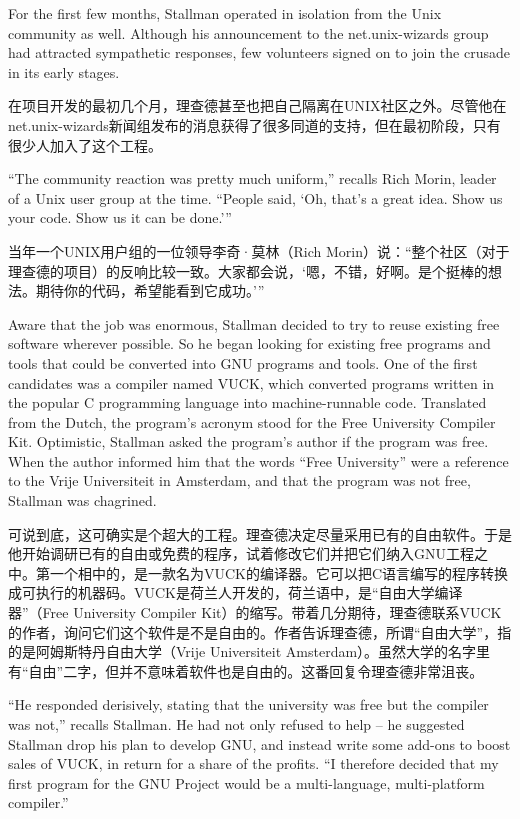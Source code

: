 \ifdefined\eng
For the first few months, Stallman operated in isolation from the Unix community as well. Although his announcement to the net.unix-wizards group had attracted sympathetic responses, few volunteers signed on to join the crusade in its early stages.
\fi

\ifdefined\chs
在项目开发的最初几个月，理查德甚至也把自己隔离在UNIX社区之外。尽管他在net.unix-wizards新闻组发布的消息获得了很多同道的支持，但在最初阶段，只有很少人加入了这个工程。
\fi

\ifdefined\eng
``The community reaction was pretty much uniform,'' recalls Rich Morin, leader of a Unix user group at the time. ``People said, `Oh, that's a great idea. Show us your code. Show us it can be done.'\hspace{0.01in}''
\fi

\ifdefined\chs
当年一个UNIX用户组的一位领导李奇·莫林（Rich Morin）说：“整个社区（对于理查德的项目）的反响比较一致。大家都会说，‘嗯，不错，好啊。是个挺棒的想法。期待你的代码，希望能看到它成功。’”
\fi

\ifdefined\eng
Aware that the job was enormous, Stallman decided to try to reuse existing free software wherever possible.  So he began looking for existing free programs and tools that could be converted into GNU programs and tools. One of the first candidates was a compiler named VUCK, which converted programs written in the popular C programming language into machine-runnable code. Translated from the Dutch, the program's acronym stood for the Free University Compiler Kit. Optimistic, Stallman asked the program's author if the program was free. When the author informed him that the words ``Free University'' were a reference to the Vrije Universiteit in Amsterdam, and that the program was not free, Stallman was chagrined.
\fi

\ifdefined\chs
可说到底，这可确实是个超大的工程。理查德决定尽量采用已有的自由软件。于是他开始调研已有的自由或免费的程序，试着修改它们并把它们纳入GNU工程之中。第一个相中的，是一款名为VUCK的编译器。它可以把C语言编写的程序转换成可执行的机器码。VUCK是荷兰人开发的，荷兰语中，是“自由大学编译器”（Free University Compiler Kit）的缩写。带着几分期待，理查德联系VUCK的作者，询问它们这个软件是不是自由的。作者告诉理查德，所谓“自由大学”，指的是阿姆斯特丹自由大学（Vrije Universiteit Amsterdam）。虽然大学的名字里有“自由”二字，但并不意味着软件也是自由的。这番回复令理查德非常沮丧。
\fi

\ifdefined\eng
``He responded derisively, stating that the university was free but the compiler was not,'' recalls Stallman. He had not only refused to help -- he suggested Stallman drop his plan to develop GNU, and instead write some add-ons to boost sales of VUCK, in return for a share of the profits. ``I therefore decided that my first program for the GNU Project would be a multi-language, multi-platform compiler.''
\fi


